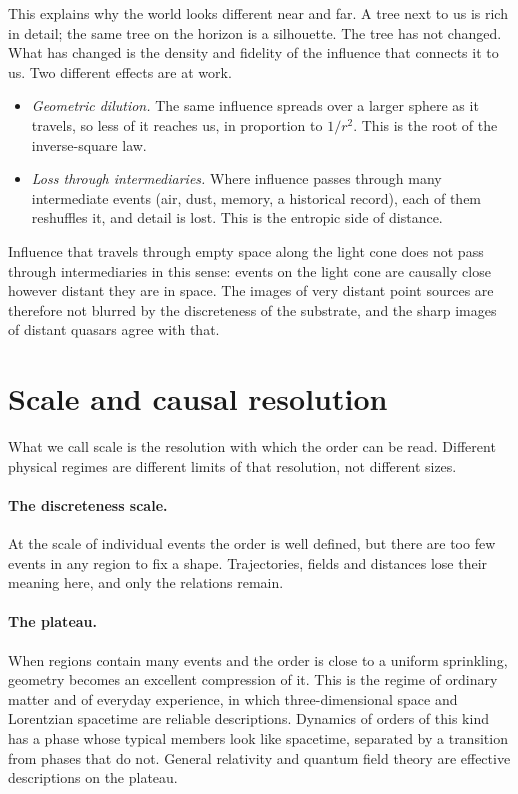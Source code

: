 This explains why the world looks different near and far. A tree next to us is rich in detail; the
same tree on the horizon is a silhouette. The tree has not changed. What has changed is the density
and fidelity of the influence that connects it to us. Two different effects are at work.
\begin{itemize}
\item \emph{Geometric dilution.} The same influence spreads over a larger sphere as it travels, so
  less of it reaches us, in proportion to $1/r^2$. This is the root of the inverse-square law.
\item \emph{Loss through intermediaries.} Where influence passes through many intermediate events
  (air, dust, memory, a historical record), each of them reshuffles it, and detail is lost. This is
  the entropic side of distance. 
\end{itemize}
Influence that travels through empty space along the light cone does not pass through intermediaries
in this sense: events on the light cone are causally close however distant they are in space. The
images of very distant point sources are therefore not blurred by the discreteness of the substrate,
and the sharp images of distant quasars agree with that. 

\section{Scale and causal resolution}\label{sec:onto-scale}

What we call scale is the resolution with which the order can be read. Different physical regimes
are different limits of that resolution, not different sizes.

\paragraph{The discreteness scale.} At the scale of individual events the order is well defined, but
there are too few events in any region to fix a shape. Trajectories, fields and distances lose their
meaning here, and only the relations remain. 

\paragraph{The plateau.} When regions contain many events and the order is close to a uniform
sprinkling, geometry becomes an excellent compression of it. This is the regime of ordinary matter
and of everyday experience, in which three-dimensional space and Lorentzian spacetime are reliable
descriptions. Dynamics of orders of this kind has a phase whose typical members look like spacetime,
separated by a transition from phases that do not.
\quad
General relativity and quantum field theory are effective descriptions on the plateau.

